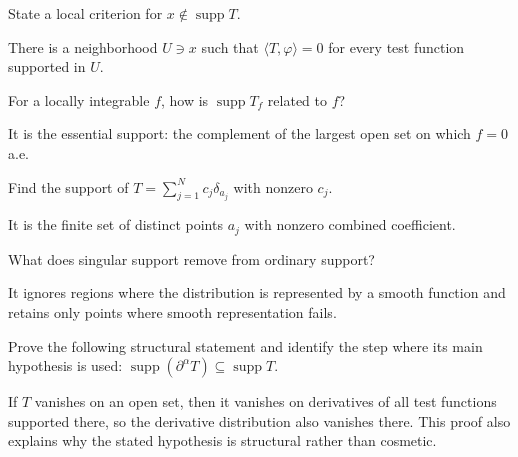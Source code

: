 \begin{problem}\label{prob:iii17-problem-05}
State a local criterion for \(x\notin\operatorname{supp}T\).
\end{problem}
\begin{solution}
There is a neighborhood \(U\ni x\) such that
\(\langle T,\varphi\rangle=0\) for every test function supported in \(U\).
\end{solution}

\begin{problem}\label{prob:iii17-problem-06}
For a locally integrable \(f\), how is \(\operatorname{supp}T_f\) related to \(f\)?
\end{problem}
\begin{solution}
It is the essential support: the complement of the largest open set on
which \(f=0\) a.e.
\end{solution}

\begin{problem}\label{prob:iii17-problem-07}
Find the support of \(T=\sum_{j=1}^Nc_j\delta_{a_j}\) with nonzero \(c_j\).
\end{problem}
\begin{solution}
It is the finite set of distinct points \(a_j\) with nonzero combined
coefficient.
\end{solution}

\begin{problem}\label{prob:iii17-problem-08}
What does singular support remove from ordinary support?
\end{problem}
\begin{solution}
It ignores regions where the distribution is represented by a smooth
function and retains only points where smooth representation fails.
\end{solution}

\begin{problem}\label{prob:iii17-problem-09}
Prove the following structural statement and identify the step where its main hypothesis is used: $\operatorname{supp}(\partial^\alpha T)\subseteq\operatorname{supp}T$.
\end{problem}
\begin{solution}
If $T$ vanishes on an open set, then it vanishes on derivatives of all test functions supported there, so the derivative distribution also vanishes there. This proof also explains why the stated hypothesis is structural rather than cosmetic.
\end{solution}

